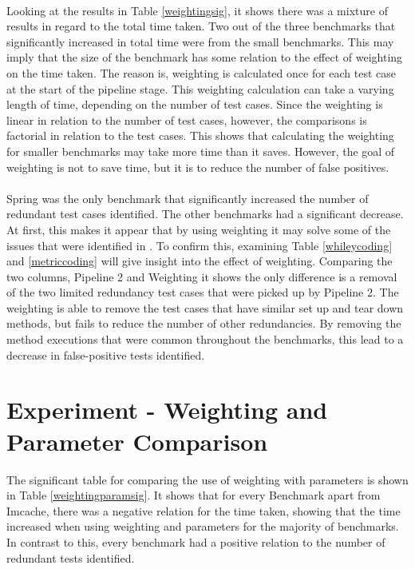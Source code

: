 \paragraph{}
Looking at the results in Table \ref{weightingsig}, it shows there was a mixture of results in regard to the total time taken. Two out of the three benchmarks that significantly increased in total time were from the small benchmarks. This may imply that the size of the benchmark has some relation to the effect of weighting on the time taken. The reason is, weighting is calculated once for each test case at the start of the pipeline stage. This weighting calculation can take a varying length of time, depending on the number of test cases. Since the weighting is linear in relation to the number of test cases, however, the comparisons is factorial in relation to the test cases. This shows that calculating the weighting for smaller benchmarks may take more time than it saves. However, the goal of weighting is not to save time, but it is to reduce the number of false positives.
\paragraph{}
Spring was the only benchmark that significantly increased the number of redundant test cases identified. The other benchmarks had a significant decrease. At first, this makes it appear that by using weighting it may solve some of the issues that were identified in \cite{koochakzadeh2009test} \cite{li2008static}. To confirm this, examining Table \ref{whileycoding} and \ref{metriccoding} will give insight into the effect of weighting. Comparing the two columns, Pipeline 2 and Weighting it shows the only difference is a removal of the two limited redundancy test cases that were picked up by Pipeline 2. The weighting is able to remove the test cases that have similar set up and tear down methods, but fails to reduce the number of other redundancies. By removing the method executions that were common throughout the benchmarks, this lead to a decrease in false-positive tests identified.


\section{Experiment  - Weighting and Parameter Comparison}

The significant table for comparing the use of weighting with parameters is shown in Table \ref{weightingparamsig}. It shows that for every Benchmark apart from Imcache, there was a negative relation for the time taken, showing that the time increased when using weighting and parameters for the majority of benchmarks. In contrast to this, every benchmark had a positive relation to the number of redundant tests identified.


